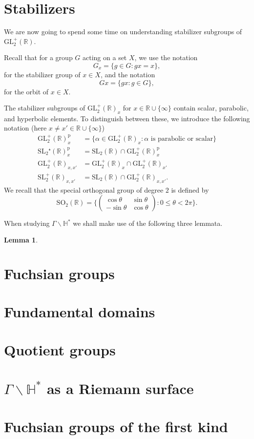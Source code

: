 \documentclass{article}
\theoremstyle{definition}
\newtheorem{lem}{Lemma}
\begin{document}
\section{Stabilizers}
We are now going to spend some time on understanding stabilizer subgroups of $\mathrm{GL}_2^+(\mathbb{R})$.

Recall that for a group $G$ acting on a set $X$, we use the notation
\[G_x=\{g\in G:gx=x\},\]
for the stabilizer group of $x\in X$, and the notation
\[Gx=\{gx:g\in G\},\]
for the orbit of $x\in X$.

The stabilizer subgroups of $\mathrm{GL}_2^+(\mathbb{R})_x$ for $x\in\mathbb{R}\cup\{\infty\}$ contain scalar, parabolic, and hyperbolic elements. To distinguish between these, we introduce the following notation (here $x\neq x'\in\mathbb{R}\cup\{\infty\}$)
\begin{align*}
	\mathrm{GL}_2^+(\mathbb{R})_x^{\mathrm{p}}&=\{\alpha\in\mathrm{GL}_2^+(\mathbb{R})_x:\alpha\text{ is parabolic or scalar}\}\\
	\mathrm{SL}_2⁺(\mathbb{R})_x^\mathrm{p}&=\mathrm{SL}_2(\mathbb{R})\cap\mathrm{GL}_2^+(\mathbb{R})_x^\mathrm{p}\\
	\mathrm{GL}_2^+(\mathbb{R})_{x,x'}&=\mathrm{GL}_2^+(\mathbb{R})_x\cap\mathrm{GL}_2^+(\mathbb{R})_{x'}\\
	\mathrm{SL}_2^+(\mathbb{R})_{x,x'}&=\mathrm{SL}_2(\mathbb{R})\cap\mathrm{GL}_2^+(\mathbb{R})_{x,x'}.
\end{align*}
We recall that the special orthogonal group of degree $2$ is defined by
\[\mathrm{SO}_2(\mathbb{R})=\Big\{\!\begin{pmatrix}\cos\theta&\sin\theta\\-\sin\theta&\cos\theta\end{pmatrix}\!:0\leq\theta<2\pi\Big\}.\]

When studying $\Gamma\backslash\mathbb{H}^\ast$ we shall make use of the following three lemmata.
\begin{lem}
\end{lem}
\section{Fuchsian groups}
\section{Fundamental domains}
\section{Quotient groups}
\section{$\Gamma\backslash\mathbb{H}^\ast$ as a Riemann surface}
\section{Fuchsian groups of the first kind}
\end{document}
